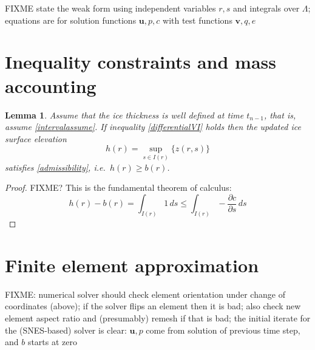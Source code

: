 \documentclass[letterpaper,final,12pt,reqno]{amsart}
\newcommand{\bu}{\mathbf{u}}
\newcommand{\bv}{\mathbf{v}}
\newtheorem{lemma}{Lemma}
\begin{document}
FIXME state the weak form using independent variables $r,s$ and integrals over $\Lambda$; equations are for solution functions $\bu,p,c$ with test functions $\bv,q,e$


\section{Inequality constraints and mass accounting} \label{sec:inequalities}

\begin{lemma}
Assume that the ice thickness is well defined at time $t_{n-1}$, that is, assume
\eqref{intervalassume}.  If inequality \eqref{differentialVI} holds then the updated ice surface elevation
    $$h(r) = \sup_{s\in I(r)}\{z(r,s)\}$$
satisfies \eqref{admissibility}, i.e.~$h(r)\ge b(r)$.
\end{lemma}

\begin{proof}
FIXME? This is the fundamental theorem of calculus:
    $$h(r) - b(r) = \int_{I(r)} 1\,ds \le \int_{I(r)} - \frac{\partial c}{\partial s}\,ds$$
\end{proof}


\section{Finite element approximation}  \label{sec:finiteelement}

FIXME: numerical solver should check element orientation under change of coordinates (above); if the solver flips an element then it is bad; also check new element aspect ratio and (presumably) remesh if that is bad; the initial iterate for the (SNES-based) solver is clear: $\bu,p$ come from solution of previous time step, and $b$ starts at zero



\small

\bigskip


\end{document}

